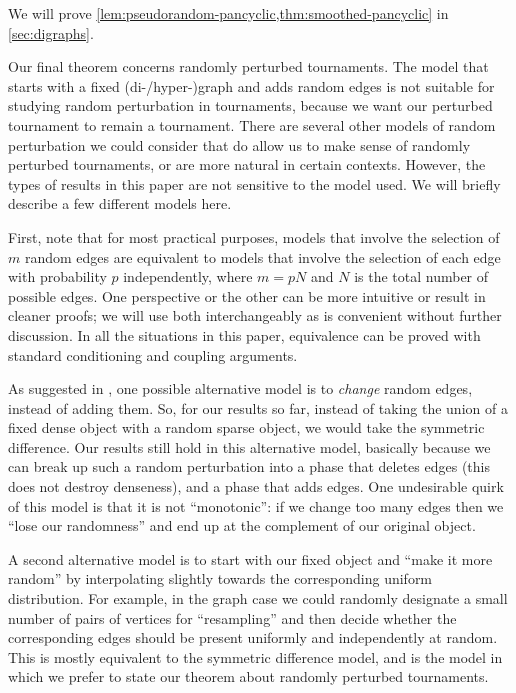 \documentclass[11pt,english]{article}
\theoremstyle{plain}
\theoremstyle{definition}
\theoremstyle{definition}
\theoremstyle{plain}
\theoremstyle{plain}
\theoremstyle{plain}
\theoremstyle{plain}
\theoremstyle{remark}
\theoremstyle{remark}
\begin{document}
We will prove \ref{lem:pseudorandom-pancyclic,thm:smoothed-pancyclic} in  \ref{sec:digraphs}.

Our final theorem concerns randomly perturbed tournaments. The model
that starts with a fixed \mbox{(di-/hyper-)}graph and adds random
edges is not suitable for studying random perturbation in tournaments,
because we want our perturbed tournament to remain a tournament. There
are several other models of random perturbation we could consider
that do allow us to make sense of randomly perturbed tournaments,
or are more natural in certain contexts. However, the types of results
in this paper are not sensitive to the model used. We will briefly
describe a few different models here.

First, note that for most practical purposes, models that involve
the selection of $m$ random edges are equivalent to models that involve
the selection of each edge with probability $p$ independently, where
$m=pN$ and $N$ is the total number of possible edges. One perspective or the other can be more intuitive
or result in cleaner proofs; we will use both interchangeably as is
convenient without further discussion. In all the situations in this
paper, equivalence can be proved with standard conditioning and coupling
arguments.

As suggested in \cite[Definition~1]{ST03}, one possible alternative
model is to \emph{change} random edges, instead of adding them. So,
for our results so far, instead of taking the union of a fixed dense
object with a random sparse object, we would take the symmetric difference.
Our results still hold in this alternative model, basically because
we can break up such a random perturbation into a phase that deletes
edges (this does not destroy denseness), and a phase that adds edges.
One undesirable quirk of this model is that it is not ``monotonic'':
if we change too many edges then we ``lose our randomness'' and
end up at the complement of our original object.

A second alternative model is to start with our fixed object and ``make
it more random'' by interpolating slightly towards the corresponding
uniform distribution. For example, in the graph case we could randomly
designate a small number of pairs of vertices for ``resampling''
and then decide whether the corresponding edges should be present
uniformly and independently at random. This is mostly equivalent to
the symmetric difference model, and is the model in which we prefer
to state our theorem about randomly perturbed tournaments.
\end{document}
